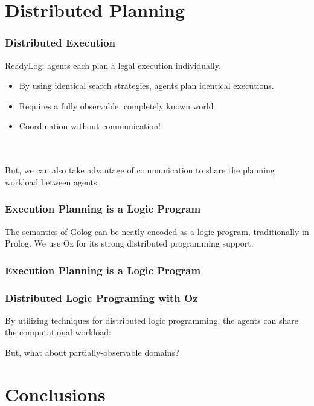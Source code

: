 \documentclass[compress]{beamer}
\begin{document}
\section{Distributed Planning}

\begin{frame}
\frametitle{Distributed Execution}
ReadyLog: agents each plan a legal execution individually.
\begin{itemize}
 \item By using identical search strategies, agents plan identical executions.
 \item Requires a fully observable, completely known world
 \item Coordination without communication!
\end{itemize}
\ \\
\ \\
But, we can also take advantage of communication to share the planning
workload between agents.

\end{frame}

\begin{frame}
\frametitle{Execution Planning is a Logic Program}
The semantics of Golog can be neatly encoded as a logic program,
traditionally in Prolog.  We use Oz for its strong distributed programming
support.

{\small  }{\small \par}

\end{frame}

\begin{frame}
\frametitle{Execution Planning is a Logic Program}

{\small  }{\small \par}

\end{frame}

\begin{frame}
\frametitle{Distributed Logic Programing with Oz}
By utilizing techniques for distributed logic programming, the agents
can share the computational workload:

\centering {\small  }

But, what about partially-observable domains?

\end{frame}

\section{Conclusions}
\end{document}
